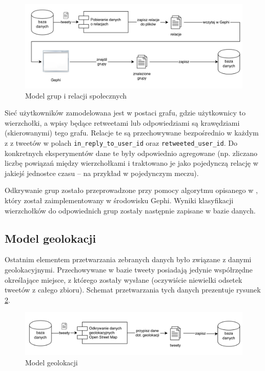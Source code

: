 \begin{figure}[ht!]
\centering
\includegraphics[width=160mm]{img/odkrywanie-relacji.png}
\caption{Model grup i relacji społecznych}
\label{image:odkrywanie-relacji}
\end{figure}


Sieć użytkowników zamodelowana jest w postaci grafu, gdzie użytkownicy to
wierzchołki, a wpisy będące retweetami lub odpowiedziami są krawędziami
(skierowanymi) tego grafu. Relacje te są przechowywane bezpośrednio w każdym z z
tweetów w polach \texttt{in\_reply\_to\_user\_id} oraz
\texttt{retweeted\_user\_id}.
Do konkretnych eksperymentów dane te były odpowiednio agregowane (np. zliczano
liczbę powiązań między wierzchołkami i traktowano je jako pojedynczą relację w
jakiejś jednostce czasu -- na przykład w pojedynczym meczu).

Odkrywanie grup zostało przeprowadzone przy pomocy algorytmu opisanego w
\cite{FastUnfoldingOfCommunites}, który został zaimplementowany w środowisku
Gephi. Wyniki klasyfikacji wierzchołków do odpowiednich grup zostały następnie
zapisane w bazie danych.


\subsection{Model geolokacji}
\label{subsection:modelgeolokacji}
Ostatnim elementem przetwarzania zebranych danych było związane z danymi
geolokacyjnymi. Przechowywane w bazie tweety posiadają jedynie współrzędne
określające miejsce, z którego zostały wysłane (oczywiście niewielki odsetek
tweetów z całego zbioru). Schemat przetwarzania tych danych prezentuje rysunek
\ref{image:odkrywanie-geolokacji}.

\begin{figure}[ht!]
\centering
\includegraphics[width=160mm]{img/odkrywanie-geolokacji.png}
\caption{Model geolokacji}
\label{image:odkrywanie-geolokacji}
\end{figure}

